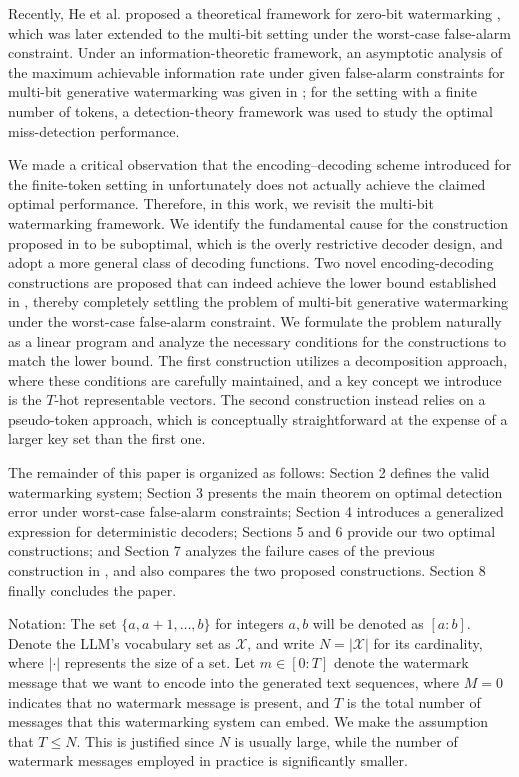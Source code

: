 \documentclass[11pt,letterpaper]{article}
\newcommand{\cX}{\mathcal{X}}
\begin{document}
Recently, He et al. proposed a theoretical framework for zero-bit watermarking \cite{he2024theoretically}, which was later extended to the multi-bit setting \cite{hedistributional} under the worst-case false-alarm constraint. Under an information-theoretic framework, an asymptotic analysis of the maximum achievable information rate under given false-alarm constraints for multi-bit generative watermarking was given in \cite{hedistributional}; for the setting with a finite number of tokens, a detection-theory framework was used to study the optimal miss-detection performance. 

We made a critical observation that the encoding–decoding scheme introduced for the finite-token setting in \cite{hedistributional} unfortunately does not actually achieve the claimed optimal performance. Therefore, in this work, we revisit the multi-bit watermarking framework. We identify the fundamental cause for the construction proposed in \cite{hedistributional} to be suboptimal, which is the overly restrictive decoder design, and adopt a more general class of decoding functions. Two novel encoding-decoding constructions are proposed that can indeed achieve the lower bound established in \cite{hedistributional}, thereby completely settling the problem of multi-bit generative watermarking under the worst-case false-alarm constraint. We formulate the problem naturally as a linear program and analyze the necessary conditions for the constructions to match the lower bound. 
The first construction utilizes a decomposition approach, where these conditions are carefully maintained, and a key concept we introduce is the $T$-hot representable vectors. The second construction instead relies on a pseudo-token approach, which is conceptually straightforward at the expense of a larger key set than the first one. 


The remainder of this paper is organized as follows: Section 2 defines the valid watermarking system; Section 3 presents the main theorem on optimal detection error under worst-case false-alarm constraints; Section 4 introduces a generalized expression for deterministic decoders; Sections 5 and 6 provide our two optimal constructions; and Section 7 analyzes the failure cases of the previous construction in \cite{hedistributional}, and also compares the two proposed constructions. Section 8 finally concludes the paper.


Notation: The set $\{a,a+1,\ldots,b\}$ for integers $a,b$ will be denoted as $[a:b]$. Denote the LLM’s vocabulary set as $\cX$, and write $N = |\cX|$ for its cardinality, where $|\cdot|$ represents the size of a set. Let $m \in [0:T]$ denote the watermark message that we want to encode into the generated text sequences, where $M = 0$ indicates that no watermark message is present, and  $T$ is the total number of messages that this watermarking system can embed.  
We make the assumption that $T \leq N$. This is justified since $N$ is usually large, while the number of watermark messages employed in practice is significantly smaller.
\end{document}
